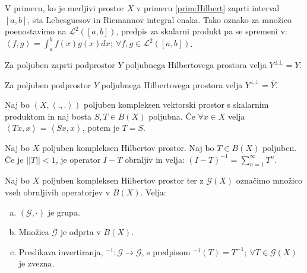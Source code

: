 \documentclass[mat2]{matdelo}
\newcommand{\abs}[1]{\ensuremath{\lvert #1 \rvert}}
\newcommand{\norm}[1]{\abs{\abs{#1}}}
\newcommand{\Sp}[2]{\ensuremath{\left<#1, #2\right>}}
\newcommand{\map}[3]{\ensuremath{{#1}:{#2}\rightarrow{#3}}}
\begin{document}
		\begin{opomba}
			\label{opomb:Hilbert}
			V primeru, ko je merljivi prostor $X$ v primeru \ref{prim:Hilbert} zaprti interval $[a, b]$, sta Lebesguesov in Riemannov integral enaka. Tako oznako za množico poenostavimo na $\mathcal{L}^2([a, b])$, predpis za skalarni produkt pa se spremeni v: $\Sp{f}{g} = \int_{a}^{b}f(x)\overline{g(x)}dx;~\forall f, g \in \mathcal{L}^2([a, b])$.
		\end{opomba}
		
		\begin{posledica}
			\label{posl:zaportoggost}
			Za poljuben zaprti podprostor $Y$ poljubnega Hilbertovega prostora velja $Y^{\bot\bot} = Y$.
		\end{posledica}
		
		\begin{posledica}
			\label{posl:ortoggost}
			Za poljuben podprostor $Y$ poljubnega Hilbertovega prostora velja $Y^{\bot\bot} = \overline{Y}$.
		\end{posledica}
		
		\begin{lema}
			\label{lem:scalprodopenak}
			Naj bo $(X, \Sp{.}{.})$ poljuben kompleksen vektorski prostor s skalarnim produktom in naj bosta $S, T \in B(X)$ poljubna. Če $\forall x\in X$ velja $\Sp{Tx}{x} = \Sp{Sx}{x}$, potem je $T = S$.
		\end{lema}
		
		\begin{izrek}
			\label{izr:Hilbertopinv}
			Naj bo $X$ poljuben kompleksen Hilbertov prostor. Naj bo $T\in B(X)$ poljuben. Če je $\norm{T}< 1$, je operator $I-T$ obrnljiv in velja: $(I-T)^{-1} = \sum_{n = 1}^{\infty}T^n$.
		\end{izrek}
		
		\begin{izrek}
			\label{izr:Hilbertinvset}
			Naj bo $X$ poljuben kompleksen Hilbertov prostor ter z $\mathcal{G}(X)$ označimo množico vseh obrnljivih operatorjev v $B(X)$. Velja: \begin{enumerate}[a)]
				\item $(\mathcal{G}, \cdot)$ je grupa.
				\item Množica $\mathcal{G}$ je odprta v $B(X)$.
				\item Preslikava invertiranja, $\map{^{-1}}{\mathcal{G}}{\mathcal{G}}$, s predpisom $^{-1}(T) = T^{-1};~\forall T\in \mathcal{G}(X)$ je zvezna.
			\end{enumerate}
		\end{izrek}
		
\end{document}
